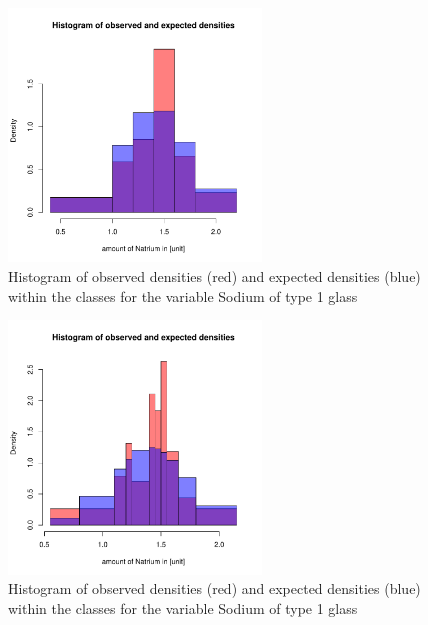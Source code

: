 \documentclass[a4paper, 12pt, titlepage, headsepline, listof = totoc, bibliography = totoc, numbers = noenddot]{scrartcl}
\begin{document}
\begin{appendix}
\begin{figure}[h!]
\centering
\includegraphics[width=0.6\textwidth]{report-chisqType2Al}
\caption{Histogram of observed densities (red) and expected densities (blue) within the classes for the variable Sodium of type 1 glass}
\label{fig:1}
\end{figure}

\begin{figure}[h!]
\centering
\includegraphics[width=0.6\textwidth]{report-chisqType2Al-30}
\caption{Histogram of observed densities (red) and expected densities (blue) within the classes for the variable Sodium of type 1 glass}
\label{fig:2}
\end{figure}

\end{appendix}


\newpage
\listoffigures
\listoftables





\end{document}
